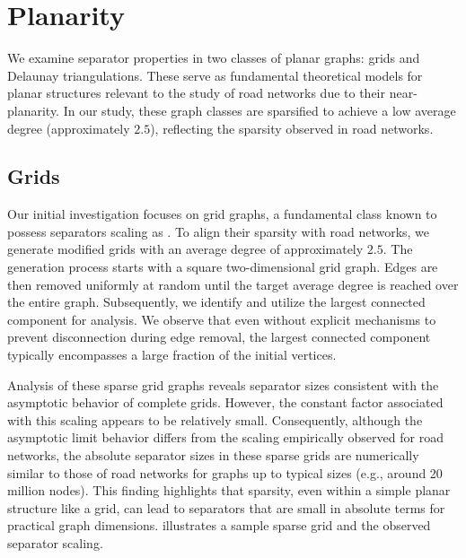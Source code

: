 \section{Planarity}
\label{sec:synthetic:planarity}

We examine separator properties in two classes of planar graphs: grids and Delaunay triangulations.
These serve as fundamental theoretical models for planar structures relevant to the study of road networks due to their near-planarity.
In our study, these graph classes are sparsified to achieve a low average degree (approximately \(2.5\)), reflecting the sparsity observed in road networks.

\subsection{Grids}
\label{sec:synthetic:grid}

Our initial investigation focuses on grid graphs, a fundamental class known to possess separators scaling as .
To align their sparsity with road networks, we generate modified grids with an average degree of approximately \(2.5\).
The generation process starts with a square two-dimensional grid graph.
Edges are then removed uniformly at random until the target average degree is reached over the entire graph.
Subsequently, we identify and utilize the largest connected component for analysis.
We observe that even without explicit mechanisms to prevent disconnection during edge removal, the largest connected component typically encompasses a large fraction of the initial vertices.

Analysis of these sparse grid graphs reveals separator sizes consistent with the  asymptotic behavior of complete grids.
However, the constant factor associated with this scaling appears to be relatively small.
Consequently, although the asymptotic limit behavior differs from the  scaling empirically observed for road networks, the absolute separator sizes in these sparse grids are numerically similar to those of road networks for graphs up to typical sizes (e.g., around 20 million nodes).
This finding highlights that sparsity, even within a simple planar structure like a grid, can lead to separators that are small in absolute terms for practical graph dimensions.
 illustrates a sample sparse grid and the observed separator scaling.


